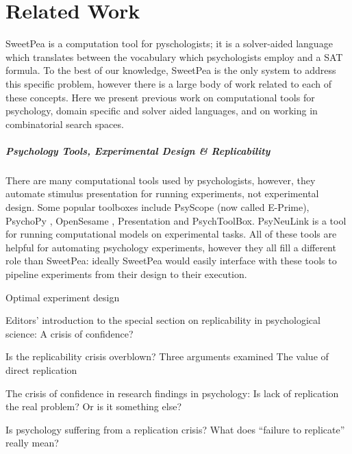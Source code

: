 

\chapter{Related Work}

SweetPea is a computation tool for pyschologists; it is a solver-aided language which translates between the vocabulary which psychologists employ and a SAT formula. To the best of our knowledge, SweetPea is the only system to address this specific problem, however there is a large body of work related to each of these concepts. Here we present previous work on computational tools for psychology, domain specific and solver aided languages, and on working in combinatorial search spaces.

\paragraph*{Psychology Tools, Experimental Design \& Replicability}

There are many computational tools used by psychologists, however, they automate stimulus presentation for running experiments, not experimental design. Some popular toolboxes include PsyScope \cite{cohen1993psyscope} (now called E-Prime), PsychoPy \cite{mathot2012opensesame}, OpenSesame \cite{peirce2009generating}, Presentation and PsychToolBox. PsyNeuLink is a tool for running computational models on experimental tasks. All of these tools are helpful for automating psychology experiments, however they all fill a different role than SweetPea: ideally SweetPea would easily interface with these tools to pipeline experiments from their design to their execution.

Optimal experiment design \cite{myung2009optimal}

Editors’ introduction to the special section on replicability in psychological science: A crisis of confidence? \cite{pashler2012editors}

Is the replicability crisis overblown? Three arguments examined \cite{pashler2012replicability}
The value of direct replication \cite{simons2014value}

The crisis of confidence in research findings in psychology: Is lack of replication the real problem? Or is it something else? \cite{schmidt2016crisis}

Is psychology suffering from a replication crisis? What does “failure to replicate” really mean? \cite{maxwell2015psychology}

